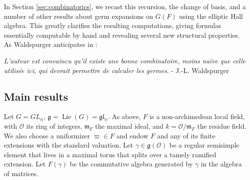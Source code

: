 \documentclass{amsart}
\numberwithin{equation}{section}
\theoremstyle{definition}
\DeclareMathOperator{\Lie}{Lie}
\newcommand{\cO}{\mathcal{O}}
\newcommand{\fl}{\mathfrak{l}}
\newcommand{\fg}{\mathfrak{g}}
\begin{document}
In Section \ref{sec:combinatorics}, we recast this recursion, the change of basis, and a number of other results about germ expansions on $G(F)$ using the elliptic Hall algebra. 
This greatly clarifies the resulting computations, giving formulas essentially computable by hand and revealing several new structural properties.
As Waldspurger anticipates in \cite{W2}:

\begin{displayquote}
{\em L'auteur est
convaincu qu'il existe une bonne combinatoire, moins naïve que celle utilisée ici, qui
devrait permettre de calculer les germes.} \hspace{5cm} - J.-L. Waldspurger \cite{W2}
\end{displayquote} 

\subsection{Main results}
\label{subsec:mainresults}
Let $G=GL_n$, $\fg=\Lie(G)=\fg\fl_n$. As above, $F$ is a non-archimedean local field, with $\cO$ its ring of integers, $\mathfrak{m}_F$ the maximal ideal, and $k=\cO/\mathfrak{m}_F$ the residue field. We also choose a uniformizer $\varpi\in F$ and endow $F$ and any of its finite extensions with the standard valuation. Let $\gamma\in\fg(\cO)$ be a regular semisimple element that lives in a maximal torus that splits over a tamely ramified extension. Let $F(\gamma)$ be the commutative algebra generated by $\gamma$ in the algebra of matrices.
\end{document}
